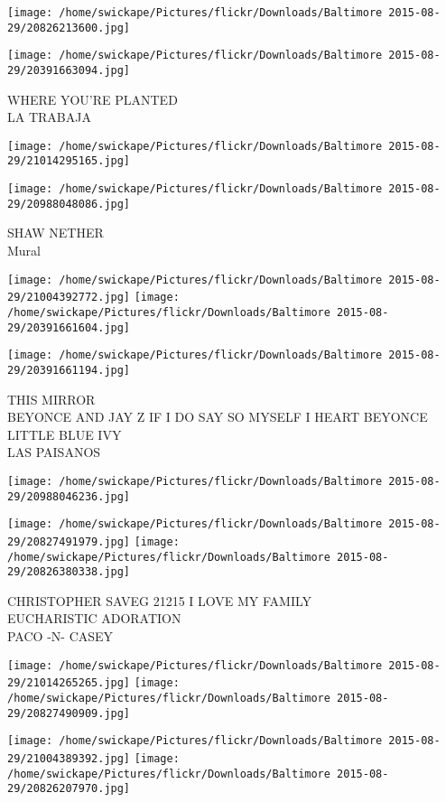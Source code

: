 \documentclass[10pt,letterpaper]{article}
\begin{document}
\texttt{[image: /home/swickape/Pictures/flickr/Downloads/Baltimore 2015-08-29/20826213600.jpg]}

\vspace{0.25in}
\texttt{[image: /home/swickape/Pictures/flickr/Downloads/Baltimore 2015-08-29/20391663094.jpg]}

WHERE YOU'RE PLANTED\\
LA TRABAJA
\pagebreak

\texttt{[image: /home/swickape/Pictures/flickr/Downloads/Baltimore 2015-08-29/21014295165.jpg]}

\vspace{0.25in}
\texttt{[image: /home/swickape/Pictures/flickr/Downloads/Baltimore 2015-08-29/20988048086.jpg]}

SHAW NETHER\\
Mural
\pagebreak

\texttt{[image: /home/swickape/Pictures/flickr/Downloads/Baltimore 2015-08-29/21004392772.jpg]}
\texttt{[image: /home/swickape/Pictures/flickr/Downloads/Baltimore 2015-08-29/20391661604.jpg]}

\texttt{[image: /home/swickape/Pictures/flickr/Downloads/Baltimore 2015-08-29/20391661194.jpg]}

THIS MIRROR\\
BEYONCE AND JAY Z IF I DO SAY SO MYSELF I HEART BEYONCE LITTLE BLUE IVY\\
LAS PAISANOS
\pagebreak

\texttt{[image: /home/swickape/Pictures/flickr/Downloads/Baltimore 2015-08-29/20988046236.jpg]}

\vspace{0.25in}
\texttt{[image: /home/swickape/Pictures/flickr/Downloads/Baltimore 2015-08-29/20827491979.jpg]}
\texttt{[image: /home/swickape/Pictures/flickr/Downloads/Baltimore 2015-08-29/20826380338.jpg]}

CHRISTOPHER SAVEG 21215 I LOVE MY FAMILY\\
EUCHARISTIC ADORATION\\
PACO {-}N{-} CASEY
\pagebreak

\texttt{[image: /home/swickape/Pictures/flickr/Downloads/Baltimore 2015-08-29/21014265265.jpg]}
\texttt{[image: /home/swickape/Pictures/flickr/Downloads/Baltimore 2015-08-29/20827490909.jpg]}

\texttt{[image: /home/swickape/Pictures/flickr/Downloads/Baltimore 2015-08-29/21004389392.jpg]}
\texttt{[image: /home/swickape/Pictures/flickr/Downloads/Baltimore 2015-08-29/20826207970.jpg]}
\end{document}

